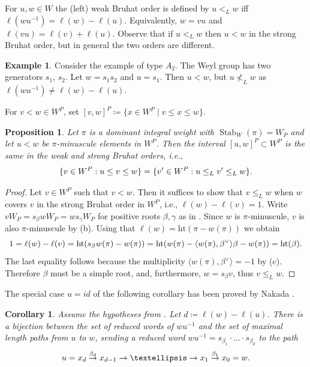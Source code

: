 \documentclass[11pt]{article}
\newtheorem{prop}[theo]{Proposition}
\newtheorem{corol}[theo]{Corollary}
\theoremstyle{definition}
\newtheorem{example}[theo]{Example}
\numberwithin{equation}{section}
\newcommand{\h}{\mathrm{ht}}
\DeclareMathOperator{\Stab}{Stab}
\begin{document}
For $u,w \in W$ the (left) weak Bruhat order is defined by $u<_L w$ iff 
$\ell(wu^{-1}) = \ell(w) - \ell(u)$. Equivalently, $w=vu$ and $\ell(vu) = \ell(v) + \ell(u)$. 
Observe that if $u<_L w$ then $u<w$ in the strong Bruhat order, but in general the 
two orders are different. 
	\begin{example}
		Consider the example of type $A_2$. The Weyl group has two generators $s_1$, $s_2$. Let $w=s_1s_2$ and $u=s_1$. Then $u<w$, but $u \nless_L w$ as $\ell(wu^{-1}) \neq \ell(w)-\ell(u)$.
\end{example}
For $v<w\in W^P$, set $[v, w]^P\coloneqq \{x\in W^P\mid v\leq x\leq w\}$. 
\begin{prop}\label{prop:weakstrong} Let $\pi$ is a dominant integral weight 
	with $\Stab_W(\pi)=W_P$
	and let $u<w$ be $\pi$-minuscule elements in $W^P$. Then the interval
	$[u,w]^P \subset W^P$ is the same in the weak and strong Bruhat orders, i.e.,
	\[ \{ v \in W^P: u \le v \le w \} = \{ v' \in W^P: u \le_L v' \le_L w \} \/. \] 
\end{prop}
\begin{proof} Let $v \in W^P$ such that $v < w$. Then it suffices to show that 
	$v \le_L w$ when $w$ covers $v$ in the strong Bruhat order in $W^P$, i.e., 
	$\ell(w) - \ell(v) =1$. Write
	$v W_P= s_\beta w W_P = w s_\gamma W_P$ for positive roots $\beta, \gamma$ as in 
	. Since $w$ is $\pi$-minuscule, $v$ is also $\pi$-minuscule 
	by  (b).
	Using that $\ell(w)= \h(\pi - w(\pi))$ we obtain 
	\[ 1 = \ell(w) - \ell(v) = \mathrm{ht}(s_\beta w(\pi) - w(\pi)) = 
	\h(w(\pi) - \langle w(\pi), \beta^\vee\rangle \beta - w(\pi)) = \h(\beta) \/.\]
	The last equality follows because the multiplicity $\langle w(\pi), \beta^\vee\rangle =-1$ 
	by (c). Therefore $\beta$ must be a simple root, and, furthermore, $w=s_\beta v$,
	thus $v \le_L w$. 
\end{proof}
The special case $u=id$ of the following corollary has been proved by Nakada
\cite[Proposition 10.3]{nakada:colored}.
\begin{corol}\label{cor:skewred} Assume the hypotheses from . Let \mbox{$d\coloneqq  \ell(w)-\ell(u)$}.
	There is a bijection between the set of reduced words of $wu^{-1}$ and the set of maximal length
	paths from $u$ to $w$, {sending a reduced word $wu^{-1} = s_{\beta_1} \cdot \ldots \cdot s_{\beta_d}$ to} the path
	\[ u=x_d\overset{\beta_d}{\to} x_{d-1}\to \ldots \to x_1\overset{\beta_1}{\to} x_0=w \/. \]
\end{corol}
\end{document}
